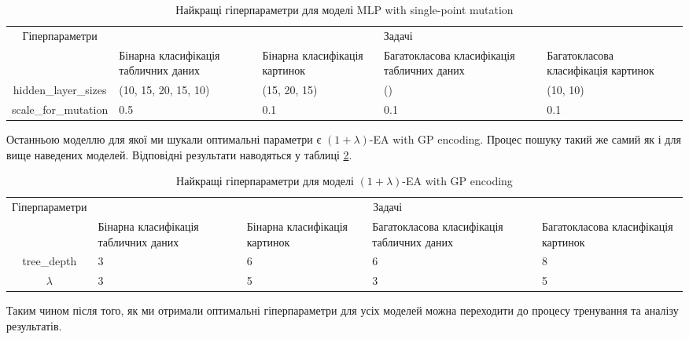 \begin{table}[ht]
	\caption{Найкращі гіперпараметри для моделі MLP with single-point mutation}
	\label{tab_hyperparameters_for_mlp_with_sp_mut}
	\centering
	\begin{adjustbox}{max width=\textwidth}
		\begin{tabular}{|c|p{3cm}|p{3cm}|p{3cm}|p{3cm}|}
			\hline \multirow{2}{*}{Гіперпараметри} & \multicolumn{4}{c|}{Задачі} \\
			\cline{2-5} & Бінарна класифікація табличних даних & Бінарна класифікація картинок & Багатокласова класифікація табличних даних & Багатокласова класифікація картинок \\
			\hline hidden\_layer\_sizes & (10, 15, 20, 15, 10) & (15, 20, 15) & () & (10, 10) \\
			\hline scale\_for\_mutation & 0.5 & 0.1 & 0.1 & 0.1 \\
			\hline
		\end{tabular}
	\end{adjustbox}
\end{table}

Останньою моделлю для якої ми шукали оптимальні параметри є $(1+\lambda)$-EA with GP encoding. Процес пошуку такий же самий як і для вище наведених моделей. Відповідні результати наводяться у таблиці \ref{tab_hyperparameters_for_evol_alg}.

\begin{table}[ht]
	\caption{Найкращі гіперпараметри для моделі $(1+\lambda)$-EA with GP encoding}
	\label{tab_hyperparameters_for_evol_alg}
	\centering
	\begin{adjustbox}{max width=\textwidth}
		\begin{tabular}{|c|p{3cm}|p{3cm}|p{3cm}|p{3cm}|}
			\hline \multirow{2}{*}{Гіперпараметри} & \multicolumn{4}{c|}{Задачі} \\
			\cline{2-5} & Бінарна класифікація табличних даних & Бінарна класифікація картинок & Багатокласова класифікація табличних даних & Багатокласова класифікація картинок \\
			\hline tree\_depth & 3 & 6 & 6 & 8 \\
			\hline $\lambda$ & 3 & 5 & 3 & 5 \\
			\hline
		\end{tabular}
	\end{adjustbox}
\end{table}

Таким чином після того, як ми отримали оптимальні гіперпараметри для усіх моделей можна переходити до процесу тренування та аналізу результатів.

